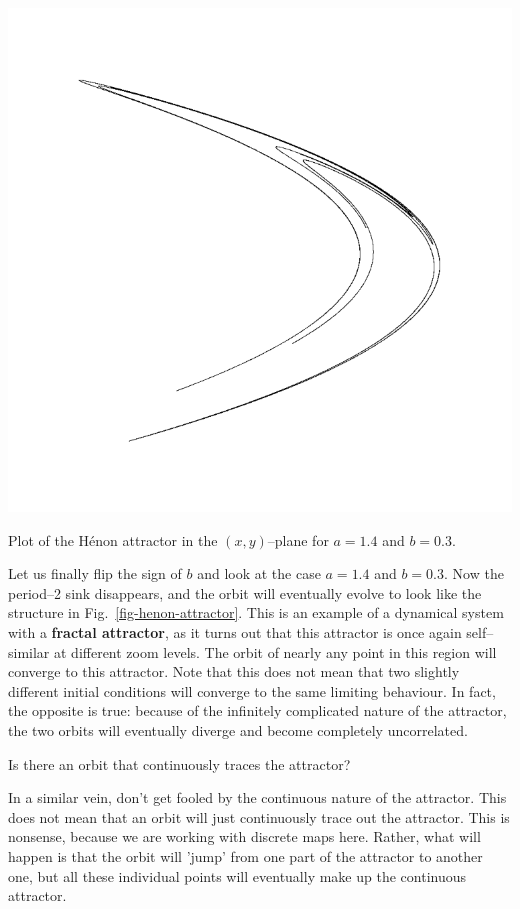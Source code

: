 \begin{marginfigure}
\centering
\includegraphics{dynamic/figures/henon_attractor}
\caption{Plot of the H\'{e}non attractor in the $(x,y)$--plane for $a=1.4$ and $b=0.3$.}
\label{fig-henon-attractor}
\end{marginfigure} 

Let us finally flip the sign of $b$ and look at the case $a=1.4$ and $b=0.3$. Now the period--2 sink disappears, and the orbit will eventually evolve to look like the structure in Fig.~\ref{fig-henon-attractor}. This is an example of a dynamical system with a \textbf{fractal attractor}, as it turns out that this attractor is once again self--similar at different zoom levels. The orbit of nearly any point in this region will converge to this attractor. Note that this does not mean that two slightly different initial conditions will converge to the same limiting behaviour. In fact, the opposite is true: because of the infinitely complicated nature of the attractor, the two orbits will eventually diverge and become completely uncorrelated.

\begin{cue}
Is there an orbit that continuously traces the attractor?  
\end{cue}

In a similar vein, don't get fooled by the continuous nature of the attractor. This does not mean that an orbit will just continuously trace out the attractor. This is nonsense, because we are working with discrete maps here. Rather, what will happen is that the orbit will 'jump' from one part of the attractor to another one, but all these individual points will eventually make up the continuous attractor.

